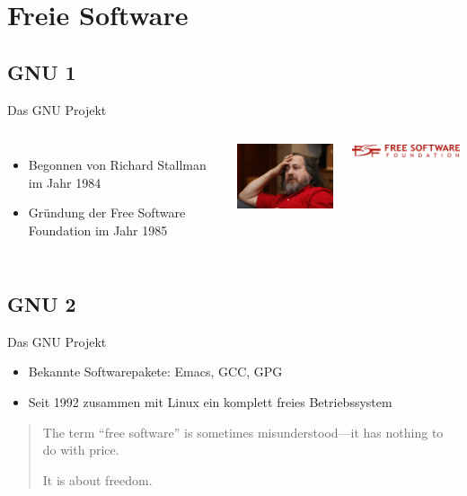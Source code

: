 \documentclass[12pt]{beamer}
\begin{document}
\subsection{}

\section{Freie Software}


\subsection{GNU 1}
\begin{frame}{Das GNU Projekt}

\begin{columns}


\column{6cm}
\begin{itemize}
\item Begonnen von Richard Stallman im Jahr 1984 
\item Gründung der Free Software Foundation im Jahr 1985 
\end{itemize}

\column{7cm}


\begin{center}
\includegraphics[width=4.5cm]{img/stallman}
\par\end{center}


\begin{center}
\includegraphics[width=5cm]{img/logo-fsf}
\par\end{center}

\end{columns}
\end{frame}



\subsection{GNU 2}
\begin{frame}{Das GNU Projekt}

\begin{itemize}
\item Bekannte Softwarepakete: Emacs, GCC, GPG 
\item Seit 1992 zusammen mit Linux ein komplett freies Betriebssystem \end{itemize}
\begin{quote}
\textquotedbl{}The term “free software” is sometimes misunderstood—it
has nothing to do with price. 

It is about freedom.\textquotedbl{} 
\end{quote}
\end{frame}
\end{document}
